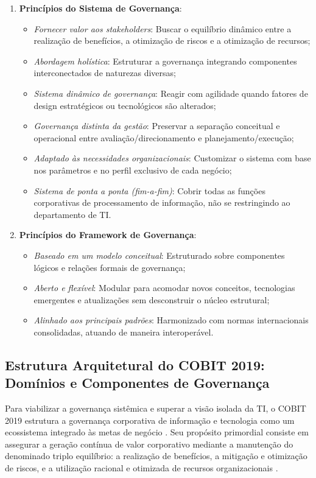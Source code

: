 \begin{enumerate}
    \item \textbf{Princípios do Sistema de Governança}:
    \begin{itemize}
        \item \textit{Fornecer valor aos stakeholders}: Buscar o equilíbrio dinâmico entre a realização de benefícios, a otimização de riscos e a otimização de recursos;
        \item \textit{Abordagem holística}: Estruturar a governança integrando componentes interconectados de naturezas diversas;
        \item \textit{Sistema dinâmico de governança}: Reagir com agilidade quando fatores de design estratégicos ou tecnológicos são alterados;
        \item \textit{Governança distinta da gestão}: Preservar a separação conceitual e operacional entre avaliação/direcionamento e planejamento/execução;
        \item \textit{Adaptado às necessidades organizacionais}: Customizar o sistema com base nos parâmetros e no perfil exclusivo de cada negócio;
        \item \textit{Sistema de ponta a ponta (fim-a-fim)}: Cobrir todas as funções corporativas de processamento de informação, não se restringindo ao departamento de TI.
    \end{itemize}
    \item \textbf{Princípios do Framework de Governança}:
    \begin{itemize}
        \item \textit{Baseado em um modelo conceitual}: Estruturado sobre componentes lógicos e relações formais de governança;
        \item \textit{Aberto e flexível}: Modular para acomodar novos conceitos, tecnologias emergentes e atualizações sem desconstruir o núcleo estrutural;
        \item \textit{Alinhado aos principais padrões}: Harmonizado com normas internacionais consolidadas, atuando de maneira interoperável.
    \end{itemize}
\end{enumerate}

\subsection{Estrutura Arquitetural do COBIT 2019: Domínios e Componentes de Governança}

Para viabilizar a governança sistêmica e superar a visão isolada da TI, o COBIT 2019 estrutura a governança corporativa de informação e tecnologia como um ecossistema integrado às metas de negócio \cite{weill2004governance,feely2007getting,isaca2019framework}. Seu propósito primordial consiste em assegurar a geração contínua de valor corporativo mediante a manutenção do denominado triplo equilíbrio: a realização de benefícios, a mitigação e otimização de riscos, e a utilização racional e otimizada de recursos organizacionais \cite{isaca2019framework}.


